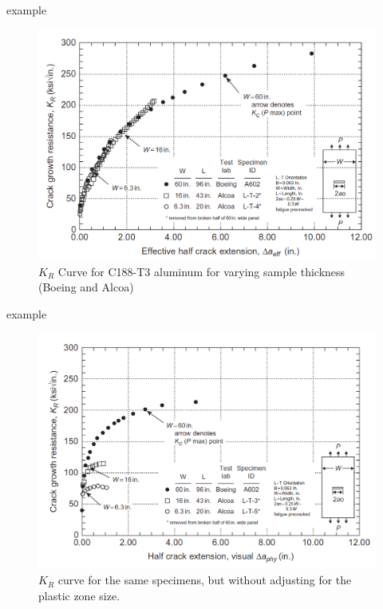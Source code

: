 \documentclass[10pt]{beamer}
\begin{document}
\begin{frame}{example}
	
\begin{figure}
\centering
\includegraphics[width=0.7\linewidth]{KR_C188T3_aluminum}
\caption{$K_R$ Curve for C188-T3 aluminum for varying sample thickness (Boeing and Alcoa)}
\label{fig:KR_C188T3_aluminum}
\end{figure}
\end{frame}

\begin{frame}{example}
\begin{figure}
\centering
\includegraphics[width=0.7\linewidth]{KR_C188T3_physical}
\caption{$K_R$ curve for the same specimens, but without adjusting for the plastic zone size.}
\label{fig:KR_C188T3_physical}
\end{figure}
\end{frame}
\end{document}
